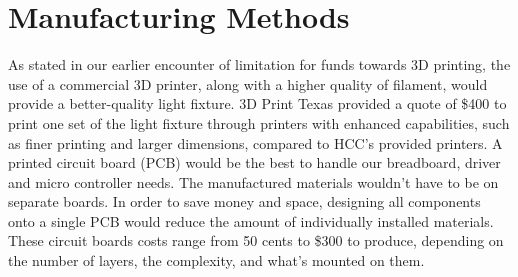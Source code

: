 \documentclass[12pt,a4paper]{report}
\begin{document}

\section{Manufacturing Methods}
As stated in our earlier encounter of limitation for funds towards 3D printing, the use of a commercial 3D printer, along with a higher quality of filament, would provide a better-quality light fixture. 3D Print Texas provided a quote of \$400 to print one set of the light fixture through printers with enhanced capabilities, such as finer printing and larger dimensions, compared to HCC's provided printers.
A printed circuit board (PCB) would be the best to handle our breadboard, driver and micro controller needs. The manufactured materials wouldn't have to be on separate boards. In order to save money and space, designing all components onto a single PCB would reduce the amount of individually installed materials. These circuit boards costs range from 50 cents to \$300 to produce, depending on the number of layers, the complexity, and what's mounted on them.
\end{document}
